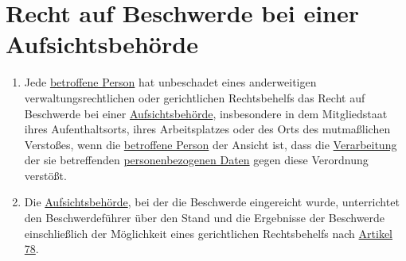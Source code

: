 \chapter{Recht auf Beschwerde bei einer Aufsichtsbehörde}
\label{ch:77}


\begin{enumerate}

  \item Jede \hyperref[itm:04-1]{betroffene Person} hat unbeschadet eines anderweitigen verwaltungsrechtlichen oder
   gerichtlichen Rechtsbehelfs das Recht auf Beschwerde bei einer \hyperref[itm:04-21]{Aufsichtsbehörde}, insbesondere
   in dem Mitgliedstaat ihres Aufenthaltsorts, ihres Arbeitsplatzes oder des Orts des mutmaßlichen Verstoßes, wenn
   die \hyperref[itm:04-1]{betroffene Person} der Ansicht ist, dass die \hyperref[itm:04-2]{Verarbeitung} der sie
   betreffenden \hyperref[itm:04-1]{personenbezogenen Daten} gegen diese Verordnung verstößt.
  \label{itm:77-1}

  \item Die \hyperref[itm:04-21]{Aufsichtsbehörde}, bei der die Beschwerde eingereicht wurde, unterrichtet den
   Beschwerdeführer über den Stand und die Ergebnisse der Beschwerde einschließlich der Möglichkeit eines gerichtlichen
   Rechtsbehelfs nach \hyperref[ch:78]{Artikel 78}.
  \label{itm:77-2}

\end{enumerate}


